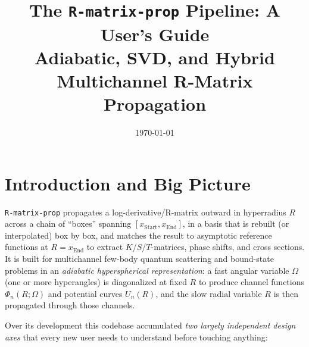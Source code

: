 \documentclass[11pt]{article}
\title{The \texttt{R-matrix-prop} Pipeline: A User's Guide\\
\large Adiabatic, SVD, and Hybrid Multichannel R-Matrix Propagation}
\author{}
\date{\today}
\begin{document}
\maketitle
\tableofcontents

\section{Introduction and Big Picture}

\texttt{R-matrix-prop} propagates a log-derivative/R-matrix outward in hyperradius $R$
across a chain of ``boxes'' spanning $[x_{\text{Start}},x_{\text{End}}]$, in a basis that is
rebuilt (or interpolated) box by box, and matches the result to asymptotic reference functions
at $R=x_{\text{End}}$ to extract $K$/$S$/$T$-matrices, phase shifts, and cross sections. It is
built for multichannel few-body quantum scattering and bound-state problems in an
\emph{adiabatic hyperspherical representation}: a fast angular variable $\Omega$ (one or more
hyperangles) is diagonalized at fixed $R$ to produce channel functions $\Phi_n(R;\Omega)$ and
potential curves $U_n(R)$, and the slow radial variable $R$ is then propagated through those
channels.

Over its development this codebase accumulated \emph{two largely independent design axes} that
every new user needs to understand before touching anything:
\end{document}
